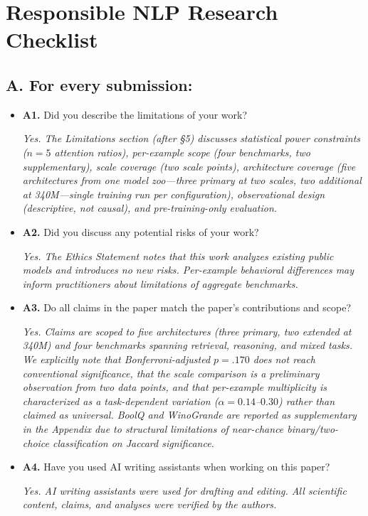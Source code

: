 \section*{Responsible NLP Research Checklist}

\subsection*{A. For every submission:}

\begin{itemize}
\item[\checkmark] \textbf{A1.} Did you describe the limitations of your work?

\textit{Yes. The Limitations section (after \S5) discusses statistical power constraints ($n = 5$ attention ratios), per-example scope (four benchmarks, two supplementary), scale coverage (two scale points), architecture coverage (five architectures from one model zoo---three primary at two scales, two additional at 340M---single training run per configuration), observational design (descriptive, not causal), and pre-training-only evaluation.}

\item[\checkmark] \textbf{A2.} Did you discuss any potential risks of your work?

\textit{Yes. The Ethics Statement notes that this work analyzes existing public models and introduces no new risks. Per-example behavioral differences may inform practitioners about limitations of aggregate benchmarks.}

\item[\checkmark] \textbf{A3.} Do all claims in the paper match the paper's contributions and scope?

\textit{Yes. Claims are scoped to five architectures (three primary, two extended at 340M) and four benchmarks spanning retrieval, reasoning, and mixed tasks. We explicitly note that Bonferroni-adjusted $p = .170$ does not reach conventional significance, that the scale comparison is a preliminary observation from two data points, and that per-example multiplicity is characterized as a task-dependent variation ($\alpha = 0.14$--$0.30$) rather than claimed as universal. BoolQ and WinoGrande are reported as supplementary in the Appendix due to structural limitations of near-chance binary/two-choice classification on Jaccard significance.}

\item[\checkmark] \textbf{A4.} Have you used AI writing assistants when working on this paper?

\textit{Yes. AI writing assistants were used for drafting and editing. All scientific content, claims, and analyses were verified by the authors.}
\end{itemize}

